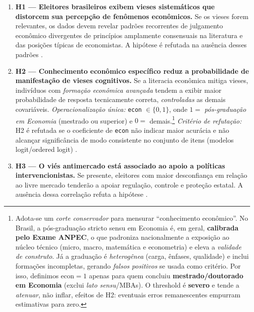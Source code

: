 \begin{enumerate}[label=\alph*)]

  \item \textbf{H1 — Eleitores brasileiros exibem vieses sistemáticos que distorcem sua percepção de fenômenos econômicos.} 
  Se os vieses forem relevantes, os dados devem revelar padrões recorrentes de julgamento econômico divergentes de princípios amplamente consensuais na literatura e das posições típicas de economistas. A hipótese é refutada na ausência desses padrões \cite{The_Myth_of_the_Rational_Voter,blendon1997}.

  \item \textbf{H2 — Conhecimento econômico específico reduz a probabilidade de manifestação de vieses cognitivos.} 
  Se a literacia econômica mitiga vieses, indivíduos com \emph{formação econômica avançada} tendem a exibir maior probabilidade de resposta tecnicamente correta, \emph{controladas} as demais covariáveis. 
  \textit{Operacionalização única:} \texttt{econ} $\in\{0,1\}$, onde $1 =$ \emph{pós-graduação em Economia} (mestrado ou superior) e $0 =$ demais.\footnote{Adota-se um \emph{corte conservador} para mensurar “conhecimento econômico”. No Brasil, a pós-graduação stricto sensu em Economia é, em geral, \textbf{calibrada pelo Exame ANPEC}, o que padroniza nacionalmente a exposição ao núcleo técnico (micro, macro, matemática e econometria) e eleva a \emph{validade de construto}. Já a graduação é \emph{heterogênea} (carga, ênfases, qualidade) e inclui formações incompletas, gerando \emph{falsos positivos} se usada como critério. Por isso, definimos $\mathrm{econ}=1$ apenas para quem concluiu \textbf{mestrado/doutorado em Economia} (exclui \emph{lato sensu}/MBAs). O threshold é \textbf{severo} e tende a \emph{atenuar}, não inflar, efeitos de H2: eventuais erros remanescentes empurram estimativas para zero.}
  \textit{Critério de refutação:} H2 é refutada se o coeficiente de \texttt{econ} não indicar maior acurácia e não alcançar significância de modo consistente no conjunto de itens (modelos logit/ordered logit) \cite{downs1957economic,Judgment_under_Uncertainty}.

  \item \textbf{H3 — O viés antimercado está associado ao apoio a políticas intervencionistas.}
  Se presente, eleitores com maior desconfiança em relação ao livre mercado tenderão a apoiar regulação, controle e proteção estatal. A ausência dessa correlação refuta a hipótese \cite{The_Myth_of_the_Rational_Voter,sowell2004applied}.


\end{enumerate}
